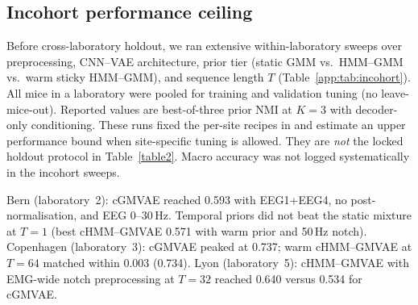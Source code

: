 \subsection{Incohort performance ceiling}
\label{app:incohort_ceiling}

Before cross-laboratory holdout, we ran extensive within-laboratory sweeps over preprocessing, CNN--VAE architecture, prior tier (static GMM vs.\ HMM--GMM vs.\ warm sticky HMM--GMM), and sequence length $T$ (Table~\ref{app:tab:incohort}).
All mice in a laboratory were pooled for training and validation tuning (no leave-mice-out).
Reported values are best-of-three prior NMI at $K{=}3$ with decoder-only conditioning.
These runs fixed the per-site recipes in  and estimate an upper performance bound when site-specific tuning is allowed.
They are \emph{not} the locked holdout protocol in Table~\ref{table2}.
Macro accuracy was not logged systematically in the incohort sweeps.

Bern (laboratory~2): cGMVAE reached 0.593 with EEG1+EEG4, no post-normalisation, and EEG 0--30\,Hz.
Temporal priors did not beat the static mixture at $T{=}1$ (best cHMM--GMVAE 0.571 with warm prior and 50\,Hz notch).
Copenhagen (laboratory~3): cGMVAE peaked at 0.737; warm cHMM--GMVAE at $T{=}64$ matched within 0.003 (0.734).
Lyon (laboratory~5): cHMM--GMVAE with EMG-wide notch preprocessing at $T{=}32$ reached 0.640 versus 0.534 for cGMVAE.

\label{app:tab:incohort}
\apptabular{}

\par\vspace{0.5em}
